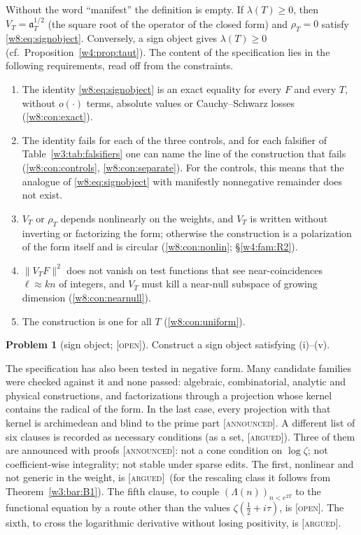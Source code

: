 \documentclass[11pt]{amsart}
\theoremstyle{definition}
\newtheorem{problem}[theorem]{Problem}
\theoremstyle{remark}
\numberwithin{equation}{section}
\newcommand{\aT}{\mathfrak{a}_T}                       %
\newcommand{\lam}{\lambda(T)}                          %
\newcommand{\stag}[1]{\textsc{[#1]}}
\newcommand{\ARGUED}{\stag{argued}}
\newcommand{\OPENQ}{\stag{open}}
\newcommand{\ANNOUNCED}{\stag{announced}}
\begin{document}
Without the word ``manifest'' the definition is empty. If $\lam\ge0$, then $V_T=\aT^{1/2}$ (the square root of the
operator of the closed form) and $\rho_T=0$ satisfy \eqref{w8:eq:signobject}. Conversely, a sign object gives
$\lam\ge0$ (cf.\ Proposition~\ref{w4:prop:taut}). The content of the specification lies in the following requirements,
read off from the constraints.
\begin{enumerate}[label=(\roman*)]
\item The identity \eqref{w8:eq:signobject} is an exact equality for every $F$ and every $T$, without $o(\cdot)$ terms,
absolute values or Cauchy--Schwarz losses (\ref{w8:con:exact}).
\item The identity fails for each of the three controls, and for each falsifier of Table~\ref{w3:tab:falsifiers} one
can name the line of the construction that fails (\ref{w8:con:controls}, \ref{w8:con:separate}). For the controls,
this means that the analogue of \eqref{w8:eq:signobject} with manifestly nonnegative remainder does not exist.
\item $V_T$ or $\rho_T$ depends nonlinearly on the weights, and $V_T$ is written without inverting or factorizing the
form; otherwise the construction is a polarization of the form itself and is circular (\ref{w8:con:nonlin};
\S\ref{w4:fam:R2}).
\item $\|V_TF\|^2$ does not vanish on test functions that see near-coincidences $\ell\approx kn$ of integers, and $V_T$ must kill a
near-null subspace of growing dimension (\ref{w8:con:nearnull}).
\item The construction is one for all $T$ (\ref{w8:con:uniform}).
\end{enumerate}

\begin{problem}[sign object; \OPENQ]\label{w8:prob:signobject}
Construct a sign object satisfying (i)--(v).
\end{problem}

The specification has also been tested in negative form. Many candidate families were checked against it and none
passed: algebraic, combinatorial, analytic and physical constructions, and factorizations through a projection whose
kernel contains the radical of the form. In the last case, every projection with that kernel is archimedean and blind
to the prime part \ANNOUNCED. A different list of six clauses is recorded as necessary conditions (as a set,
\ARGUED). Three of them are announced with proofs \ANNOUNCED: not a cone condition on $\log\zeta$; not coefficient-wise
integrality; not stable under sparse edits. The first, nonlinear and not generic in the weight, is \ARGUED\ (for the
rescaling class it follows from Theorem~\ref{w3:bar:B1}). The fifth clause, to couple $(\Lambda(n))_{n<e^{2T}}$ to the functional
equation by a route other than the values $\zeta(\frac12+i\tau)$, is \OPENQ. The sixth, to cross the logarithmic
derivative without losing positivity, is \ARGUED.
\end{document}
